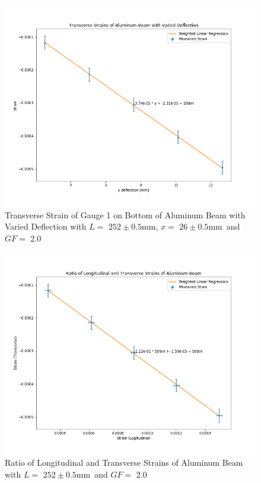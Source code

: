 \documentclass[]{article}
\newcommand{\xBottom}{\ensuremath{26 \pm 0.5 \si{\milli\meter}}}
\newcommand{\GF}{\ensuremath{2.0}}
\newcommand{\LThree}{\ensuremath{252 \pm 0.5 \si{\milli\meter}}}
\begin{document}
\newpage
\begin{figure}[hp]
    \includegraphics[width=\textwidth]{../output/graph/transverse.png}
    \caption{Transverse Strain of Gauge 1 on Bottom of Aluminum Beam with
    Varied Deflection with $L=$ \LThree, $x=$ \xBottom\ and $GF=$ \GF}\label{fig:transverse}
\end{figure}

\newpage
\begin{figure}[hp]
    \includegraphics[width=\textwidth]{../output/graph/poisson.png}
    \caption{Ratio of Longitudinal and Transverse Strains of Aluminum
    Beam with $L=$ \LThree\ and $GF=$ \GF}\label{fig:poisson}
\end{figure}
\end{document}
